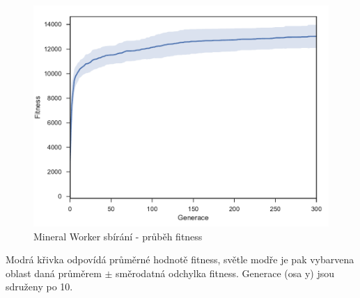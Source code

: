 \clearpage
\begin{figure}[t]\centering
	\includegraphics[width=\columnwidth]{../img/MineralMap/MineralWorkerPickup}
	\caption{Mineral Worker sbírání - průběh fitness}
	\label{obr04:MineralWorkerPickUp}
\end{figure}
Modrá křivka odpovídá průměrné hodnotě fitness, světle modře je pak vybarvena oblast daná průměrem $\pm$ směrodatná odchylka fitness. Generace (osa y) jsou sdruženy po 10. 
\clearpage

